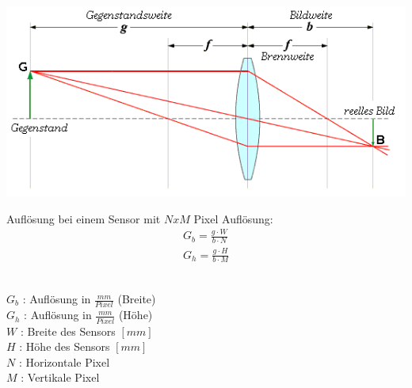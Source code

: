 \begin{center}
	\includegraphics[scale=0.35]{../fig/linse.png}
\end{center}
Auflösung bei einem Sensor mit $NxM$ Pixel Auflösung:
\[
	\begin{aligned}
		G_{b} = \frac{g \cdot W}{b \cdot N}\\
		G_{h} = \frac{g \cdot H}{b \cdot M}
	\end{aligned}
\]\\
\begin{footnotesize}
	$G_b$ : Auflösung in $\frac{mm}{Pixel}$ (Breite)\\
	$G_h$ : Auflösung in $\frac{mm}{Pixel}$ (Höhe)\\
	$W$ : Breite des Sensors $[mm]$\\
	$H$ : Höhe des Sensors $[mm]$\\
	$N$ : Horizontale Pixel\\
	$M$ : Vertikale Pixel \\	
\end{footnotesize}
\\\\

